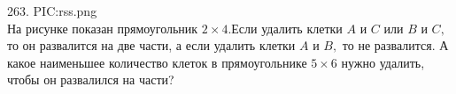 263. {{PIC:rss.png}}\\
На рисунке показан прямоугольник $2\times4.$Если удалить клетки $A$ и $C$ или $B$ и $C,$ то он развалится на две части, а если удалить клетки $A$ и $B,$ то не развалится. А какое наименьшее количество клеток в прямоугольнике $5\times6$ нужно удалить, чтобы он развалился на части?\\
